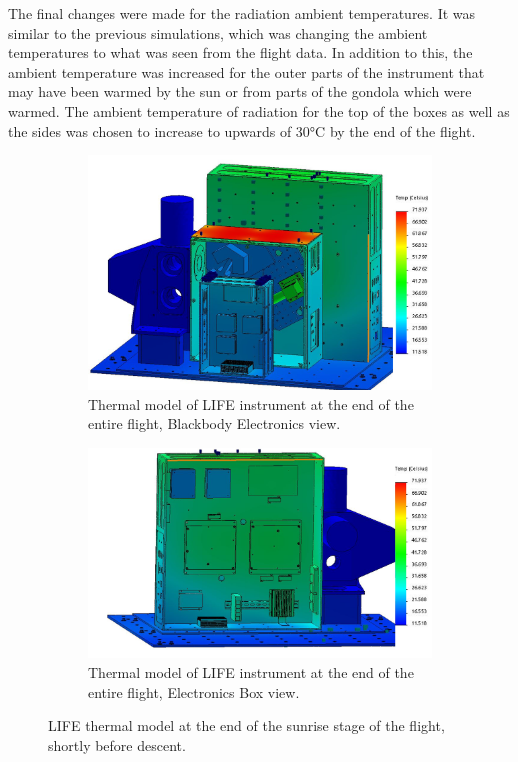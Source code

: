 The final changes were made for the radiation ambient temperatures. It was similar to the previous simulations, which was changing the ambient temperatures to what was seen from the flight data. In addition to this, the ambient temperature was increased for the outer parts of the instrument that may have been warmed by the sun or from parts of the gondola which were warmed. The ambient temperature of radiation for the top of the boxes as well as the sides was chosen to increase to upwards of 30°C by the end of the flight.

\begin{figure}
    \centering
    \begin{subfigure}[h]{0.8\textwidth}
        \centering
        \includegraphics[width=\textwidth]{chap4_images/sunrise_images/Test_11_BBEbox_FIXED.png}
        \caption{Thermal model of LIFE instrument at the end of the entire flight, Blackbody Electronics view.}
        \label{fig:sunrise_model_ebox}
    \end{subfigure}
    \begin{subfigure}[h]{0.9\textwidth}
        \centering
        \includegraphics[width=\textwidth]{chap4_images/sunrise_images/Test_11_Ebox_FIXED.png}
        \caption{Thermal model of LIFE instrument at the end of the entire flight, Electronics Box view.}
        \label{sunrise_model_ebox}
    \end{subfigure}
    \caption{LIFE thermal model at the end of the sunrise stage of the flight, shortly before descent.}
    \label{sunrise_model}
\end{figure}

